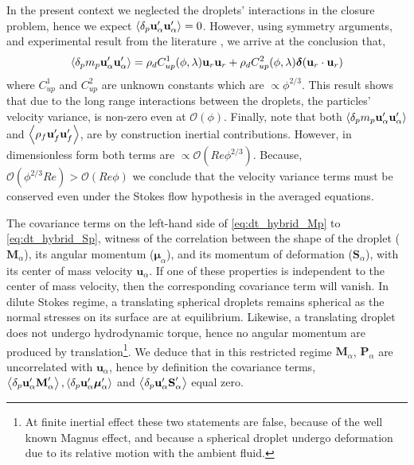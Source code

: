 In the present context we neglected the droplets' interactions in the closure problem, hence we expect $\left<\delta_{p} \textbf{u}_\alpha'\textbf{u}_\alpha'\right>=0$.
However, using symmetry arguments, and experimental result from the literature \citep{guazzelli2011fluctuations}, we arrive at the conclusion that, 
\begin{equation}
    \pavg{m_p \textbf{u}_\alpha'\textbf{u}_\alpha'}
    =
    \rho_d C^1_{up}(\phi,\lambda)\textbf{u}_r\textbf{u}_r
    + \rho_d C^2_{up}(\phi,\lambda) \bm\delta(\textbf{u}_r\cdot \textbf{u}_r)
    \label{eq:upup}
\end{equation}
where $C_{up}^1$ and $C_{up}^2$ are unknown constants which are $\propto \phi^{2/3}$\citep{guazzelli2011fluctuations}. 
This result shows that due to the long range interactions between the droplets, the particles' velocity variance, is non-zero even at $\mathcal{O(\phi)}$. 
Finally, note that both $\left<\delta_{p} m_p \textbf{u}_\alpha'\textbf{u}_\alpha'\right>$ and $\left<\rho_f \textbf{u}_f'\textbf{u}_f'\right>$, are by construction inertial contributions.
However, in dimensionless form both terms are $\propto \mathcal{O}(Re \phi^{2/3})$. 
Because,  $\mathcal{O}(\phi^{2/3}Re) > \mathcal{O}(Re\phi)$ we conclude that the velocity variance terms must be conserved even under the Stokes flow hypothesis in the averaged equations. 


The covariance terms on the left-hand side of \ref{eq:dt_hybrid_Mp} to \ref{eq:dt_hybrid_Sp}, witness of the correlation between the shape of the droplet ($\textbf{M}_\alpha$), its angular momentum ($\bm\mu_\alpha$), and its momentum of deformation ($\textbf{S}_\alpha$), with its center of mass velocity $\textbf{u}_\alpha$. 
If one of these properties is independent to the center of mass velocity, then the corresponding covariance term will vanish. 
In dilute Stokes regime, a translating spherical droplets remains spherical as the normal stresses on its surface are at equilibrium\citep{taylor1964deformation}. 
Likewise, a translating droplet does not undergo hydrodynamic torque, hence no angular momentum are produced by translation\footnote{At finite inertial effect these two statements are false, because of the well known Magnus effect, and because a spherical droplet undergo deformation due to its relative motion with the ambient fluid.}.
We deduce that in this restricted regime $\textbf{M}_\alpha$, $\textbf{P}_\alpha$ are uncorrelated with $\textbf{u}_\alpha$, hence by definition the covariance terms, $\left<\delta_{p} \textbf{u}_\alpha' \textbf{M}_\alpha'\right>,\left<\delta_{p} \textbf{u}_\alpha' \bm\mu_\alpha'\right>$ and $\left<\delta_{p} \textbf{u}_\alpha' \textbf{S}_\alpha'\right>$ equal zero. 


